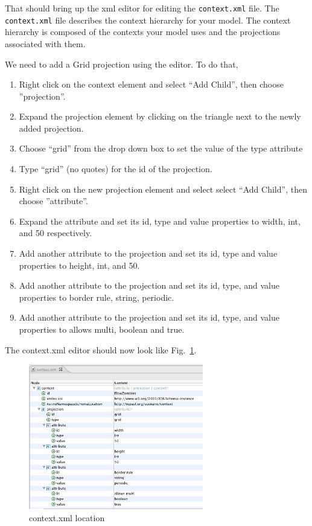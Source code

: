 \documentclass[11pt]{amsart}
\begin{document}
That should bring up the xml editor for editing the \texttt{context.xml} file. The \texttt{context.xml} file describes the context hierarchy for your model. The context hierarchy is composed of the contexts your model uses and the projections associated with them. 

We need to add a Grid projection using the editor.  To do that, 
\vspace{.2in}
\begin{enumerate}
\item Right click on the context element and select ``Add Child'', then choose ''projection''.
\item Expand the projection element by clicking on the triangle next to the newly added projection.
\item Choose ``grid'' from the drop down box to set the value of the type attribute
\item Type ``grid'' (no quotes) for the id of the projection.
\item Right click on the new projection element and select select ``Add Child'', then choose ''attribute''.
\item Expand the attribute and set its id, type and value properties to width, int, and 50 respectively.
\item Add another attribute to the projection and set its id, type and value properties to height, int, and 50.
\item Add another attribute to the projection and set its id, type, and value properties to border rule, string, periodic.
\item Add another attribute to the projection and set its id, type, and value properties to allows multi, boolean and true.
\end{enumerate}

The context.xml editor should now look like Fig.~\ref{fig:context}.

\begin{figure}[h]
\begin{center}
\vspace{.2in}
\centerline {
\includegraphics[width=3in]{figs/context.png}
}
\caption{context.xml location}
\label{fig:context}
\end{center}
\end{figure}
\end{document}
